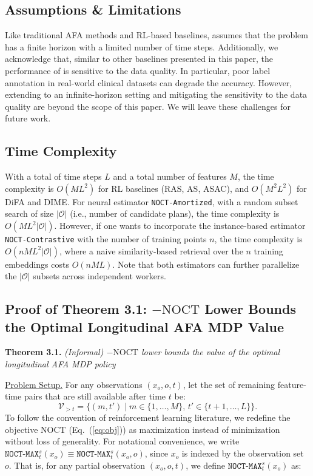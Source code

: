 \subsection{Assumptions \& Limitations}
\label{appendex:Limitations}
Like traditional AFA methods and RL-based baselines, \texttt{\OurMethod} assumes that the problem has a finite horizon with a limited number of time steps. Additionally, we acknowledge that, similar to other baselines presented in this paper, the performance of \texttt{\OurMethod} is sensitive to the data quality. In particular, poor label annotation in real-world clinical datasets can degrade the accuracy. However, extending to an infinite-horizon setting and mitigating the sensitivity to the data quality are beyond the scope of this paper. We will leave these challenges for future work. 



\subsection{Time Complexity}
\label{appendex:Time}
With a total of time steps $L$ and a total number of features $M$, the time complexity is $O(ML^2)$ for RL baselines (RAS, AS, ASAC), and $O(M^2L^2)$ for DiFA and DIME. For neural estimator \texttt{NOCT-Amortized}, with a random subset search of size $|\mathcal{O}|$ (i.e., number of candidate plans), the time complexity is $O(ML^2|\mathcal{O}|)$. However, if one wants to incorporate the instance-based estimator \texttt{NOCT-Contrastive} with the number of training points $n$, the time complexity is $O(nML^2|\mathcal{O}|)$, where a naive similarity-based retrieval over the $n$ training embeddings costs $O(nML)$. Note that both estimators can further parallelize the $|\mathcal{O}|$ subsets across independent workers.

\subsection{Proof of Theorem 3.1: $-\mathrm{NOCT}$ Lower Bounds the Optimal Longitudinal AFA MDP Value}
\label{appendex:theorem}

\textbf{Theorem 3.1.} \emph{(Informal) $-\mathrm{NOCT}$ lower bounds the value of the optimal longitudinal AFA MDP policy}

\uline{Problem Setup.} For any observations $(x_o, o, t)$, let the set of remaining feature-time pairs that are still available after time $t$ be:
\begin{equation*}
\mathcal{V}_{>t} = \{(m, t') \mid m \in \{1, \ldots, M\}, \, t' \in \{t+1, \ldots, L\}\}.
\end{equation*}
To follow the convention of reinforcement learning literature, we redefine the objective NOCT (Eq.~(\ref{eq:obj})) as maximization instead of minimization without loss of generality. For notational convenience, we write $\texttt{NOCT-MAX}^s_t(x_o)\equiv \texttt{NOCT-MAX}^s_t(x_o,o)$, since $x_o$ is indexed by the observation set $o$. That is, for any partial observation $(x_o,o,t)$, we define $\texttt{NOCT-MAX}^s_t(x_o)$ as:


